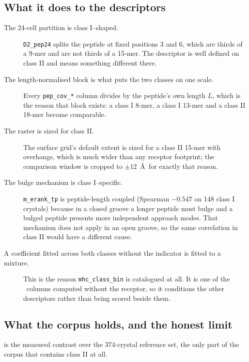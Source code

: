 \documentclass[11pt,a4paper]{article}
\newcommand{\dsc}[1]{\texttt{#1}}
\begin{document}
\subsection{What it does to the descriptors}

\begin{description}
\item[The 24-cell partition is class I--shaped.] \dsc{D2\_pep24} splits the peptide at fixed
  positions 3 and 6, which are thirds of a 9-mer and are not thirds of a 15-mer. The descriptor is
  well defined on class II and means something different there.
\item[The length-normalised block is what puts the two classes on one scale.] Every
  \dsc{pep\_cov\_*} column divides by the peptide's own length $L$, which is the reason that block
  exists: a class I 8-mer, a class I 13-mer and a class II 18-mer become comparable.
\item[The raster is sized for class II.] The surface grid's default extent is sized for a class II
  15-mer with overhangs, which is much wider than any receptor footprint; the comparison window is
  cropped to $\pm 12$~\AA\ for exactly that reason.
\item[The bulge mechanism is class I--specific.] \dsc{m\_erank\_tp} is peptide-length coupled
  (Spearman $-0.547$ on 148 class I crystals) because in a closed groove a longer peptide must bulge
  and a bulged peptide presents more independent approach modes. That mechanism does not apply in an
  open groove, so the same correlation in class II would have a different cause.
\item[A coefficient fitted across both classes without the indicator is fitted to a mixture.] This
  is the reason \dsc{mhc\_class\_bin} is catalogued at all. It is one of the \nNoReceptor\ columns
  computed without the receptor, so it conditions the other descriptors rather than being scored
  beside them.
\end{description}

\subsection{What the corpus holds, and the honest limit}

 is the measured contrast over the 374-crystal reference set, the only part of the
corpus that contains class II at all.
\end{document}
